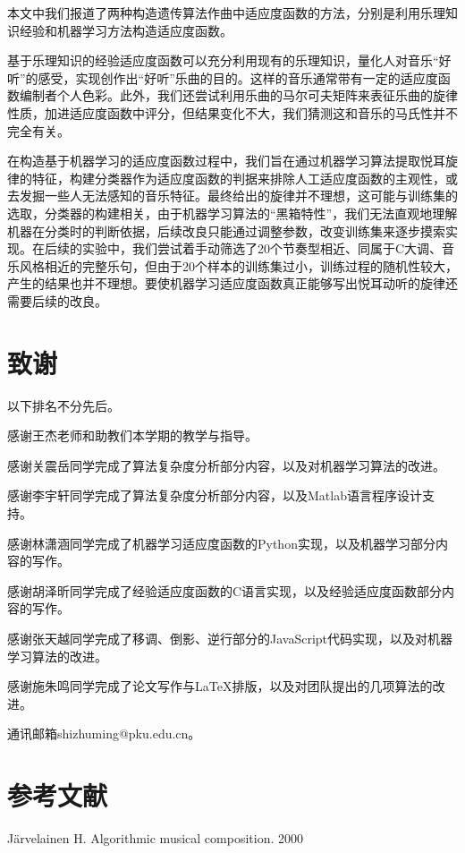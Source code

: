\documentclass[UTF8,a4paper,10pt]{ctexart}
\begin{document}
    本文中我们报道了两种构造遗传算法作曲中适应度函数的方法，分别是利用乐理知识经验和机器学习方法构造适应度函数。\par
    基于乐理知识的经验适应度函数可以充分利用现有的乐理知识，量化人对音乐“好听”的感受，实现创作出“好听”乐曲的目的。这样的音乐通常带有一定的适应度函数编制者个人色彩。此外，我们还尝试利用乐曲的马尔可夫矩阵来表征乐曲的旋律性质，加进适应度函数中评分，但结果变化不大，我们猜测这和音乐的马氏性并不完全有关。\par
    在构造基于机器学习的适应度函数过程中，我们旨在通过机器学习算法提取悦耳旋律的特征，构建分类器作为适应度函数的判据来排除人工适应度函数的主观性，或去发掘一些人无法感知的音乐特征。最终给出的旋律并不理想，这可能与训练集的选取，分类器的构建相关，由于机器学习算法的“黑箱特性”，我们无法直观地理解机器在分类时的判断依据，后续改良只能通过调整参数，改变训练集来逐步摸索实现。在后续的实验中，我们尝试着手动筛选了20个节奏型相近、同属于C大调、音乐风格相近的完整乐句，但由于20个样本的训练集过小，训练过程的随机性较大，产生的结果也并不理想。要使机器学习适应度函数真正能够写出悦耳动听的旋律还需要后续的改良。

    \section{\textcolor[rgb]{0,0.3,0.6}{致谢}}
    以下排名不分先后。\par 
    感谢王杰老师和助教们本学期的教学与指导。\par
    感谢关震岳同学完成了算法复杂度分析部分内容，以及对机器学习算法的改进。\par 
    感谢李宇轩同学完成了算法复杂度分析部分内容，以及Matlab语言程序设计支持。\par 
    感谢林潇涵同学完成了机器学习适应度函数的Python实现，以及机器学习部分内容的写作。\par
    感谢胡泽昕同学完成了经验适应度函数的C语言实现，以及经验适应度函数部分内容的写作。\par
    感谢张天越同学完成了移调、倒影、逆行部分的JavaScript代码实现，以及对机器学习算法的改进。\par 
    感谢施朱鸣同学完成了论文写作与\LaTeX 排版，以及对团队提出的几项算法的改进。\par
    通讯邮箱shizhuming@pku.edu.cn。

    \section{\textcolor[rgb]{0,0.3,0.6}{参考文献}}
    Järvelainen H. Algorithmic musical composition. 2000\\
\end{document}
